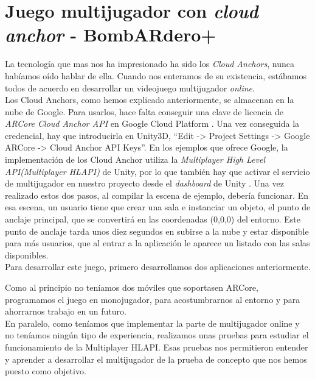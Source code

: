 \newpage
\section{Juego multijugador con \textit{cloud anchor} - BombARdero+}
La tecnología que mas nos ha impresionado ha sido los \textit{Cloud Anchors}, nunca habíamos oído hablar de ella. Cuando nos enteramos de su existencia, estábamos todos de acuerdo en desarrollar un videojuego multijugador \textit{online}.\\

Los Cloud Anchors, como hemos explicado anteriormente, se almacenan en la nube de Google. Para usarlos, hace falta conseguir una clave de licencia de \textit{ARCore Cloud Anchor API} en Google Cloud Platform \cite{GCloud}. Una vez conseguida la credencial, hay que introducirla en Unity3D, ``Edit -> Project Settings -> Google ARCore -> Cloud Anchor API Keys''. En los ejemplos que ofrece Google, la implementación de los Cloud Anchor utiliza la \textit{Multiplayer High Level API(Multiplayer HLAPI)} de Unity, por lo que también hay que activar el servicio de multijugador en nuestro proyecto desde el \textit{dashboard} de Unity \cite{UnityDashboard}. Una vez realizado estos dos pasos, al compilar la escena de ejemplo, debería funcionar. En esa escena, un usuario tiene que crear una sala e instanciar un objeto, el punto de anclaje principal, que se convertirá en las coordenadas (0,0,0) del entorno.
Este punto de anclaje tarda unos diez segundos en subirse a la nube y estar disponible para más usuarios, que al entrar a la aplicación le aparece un listado con las salas disponibles. \\

Para desarrollar este juego, primero desarrollamos dos aplicaciones anteriormente.

Como al principio no teníamos dos móviles que soportasen ARCore, programamos el juego en monojugador, para acostumbrarnos al entorno y para ahorrarnos trabajo en un futuro.\\

En paralelo, como teníamos que implementar la parte de multijugador online y no teníamos ningún tipo de experiencia, realizamos unas pruebas para estudiar el funcionamiento de la Multiplayer HLAPI. Esas pruebas nos permitieron entender y aprender a desarrollar el multijugador de la prueba de concepto que nos hemos puesto como objetivo.\\

